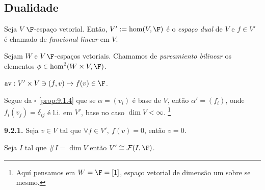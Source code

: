 \setcounter{subsection}{1}
\subsection{Dualidade}

\begin{definition}
    Seja \(V\) \(\F\)-espaço vetorial. Então, \(V':= \hom(V,\F)\) é o \emph{espaço dual} de \(V\) e \(f \in V'\) é chamado de \emph{funcional linear} em \(V\).   
\end{definition}

\begin{definition}
    Sejam \(W\) e \(V\) \(\F\)-espaços vetoriais. Chamamos de \emph{pareamiento bilinear} os elementos \(\phi \in \hom^2(W\times V,\F)\).  
\end{definition}

\begin{example}
    \(\operatorname{av}: V' \times V \ni (f,v) \mapsto f(v) \in \F\). 
\end{example}   
 
\begin{note}
    Segue da \(\square\) \ref{prop:9.1.4} que se \(\alpha = (v_i)\) é base de \(V\), então \(\alpha' = (f_i)\), onde \(f_i(v_j) = \delta_{ij}\) é l.i. em \(V'\), base no caso \(\dim V <\infty\). \footnote{Aquí pensamos em \(W=\F = [1]\), espaço vetorial de dimensão um sobre se mesmo. }%
\end{note}

\hypertarget{corol921}{}
\begin{corollary}
    \textbf{9.2.1.} Seja \(v\in V\) tal que \(\forall f \in V',\ f(v) = 0 \), então \(v = 0\). 
\end{corollary}
 
\begin{proposition}
    \label{prop:9.2.2}
   Seja \(I\) tal que  \(\# I = \dim V\) então \(V'\cong \mathcal{F}(I, \F)\). 
\end{proposition}


